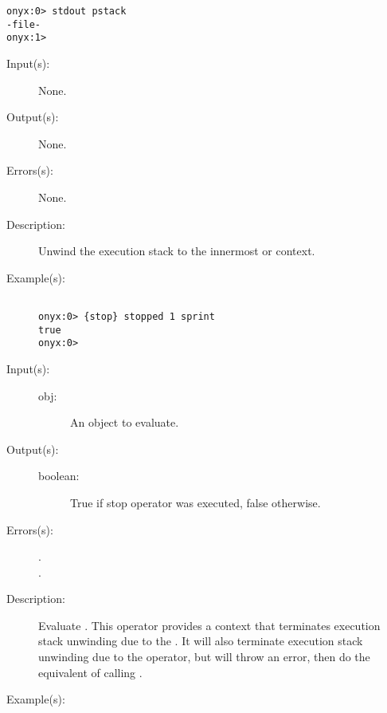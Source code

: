 \begin{description}
\begin{description}
\begin{verbatim}
onyx:0> stdout pstack
-file-
onyx:1>
		\end{verbatim}
	\end{description}
\label{systemdict:stop}
\item[{\onyxop{--}{stop}{--}}: ]
	\begin{description}\item[]
	\item[Input(s): ] None.
	\item[Output(s): ] None.
	\item[Errors(s): ] None.
	\item[Description: ]
		Unwind the execution stack to the innermost
		 or
		 context.
	\item[Example(s): ]\begin{verbatim}

onyx:0> {stop} stopped 1 sprint
true
onyx:0>
		\end{verbatim}
	\end{description}
\label{systemdict:stopped}
\item[{\onyxop{obj}{stopped}{boolean}}: ]
	\begin{description}\item[]
	\item[Input(s): ]
		\begin{description}\item[]
		\item[obj: ]
			An object to evaluate.
		\end{description}
	\item[Output(s): ]
		\begin{description}\item[]
		\item[boolean: ]
			True if stop operator was executed, false otherwise.
		\end{description}
	\item[Errors(s): ]
		\begin{description}\item[]
		\item[.]
		\item[.]
		\end{description}
	\item[Description: ]
		Evaluate .  This operator provides a context that
		terminates execution stack unwinding due to the
		.  It will also
		terminate execution stack unwinding due to the 
		 operator, but will
		throw an  error, then do the
		equivalent of calling
		.
	\item[Example(s): ]\begin{verbatim}


\end{verbatim}
\end{description}
\end{description}
